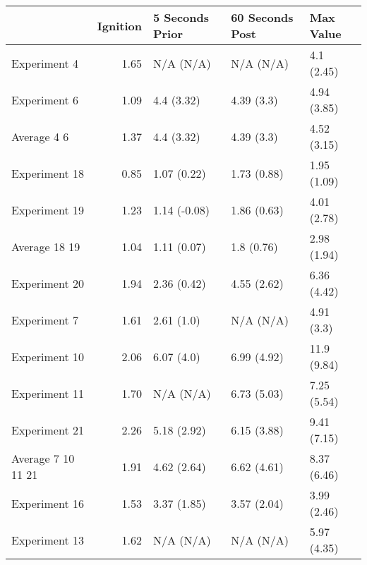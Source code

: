 \begin{tabular}{lrlll}
\toprule
{} &  Ignition & 5 Seconds Prior & 60 Seconds Post &    Max Value \\
\midrule
Experiment 4       &      1.65 &       N/A (N/A) &       N/A (N/A) &   4.1 (2.45) \\
Experiment 6       &      1.09 &      4.4 (3.32) &      4.39 (3.3) &  4.94 (3.85) \\
Average 4 6        &      1.37 &      4.4 (3.32) &      4.39 (3.3) &  4.52 (3.15) \\
Experiment 18      &      0.85 &     1.07 (0.22) &     1.73 (0.88) &  1.95 (1.09) \\
Experiment 19      &      1.23 &    1.14 (-0.08) &     1.86 (0.63) &  4.01 (2.78) \\
Average 18 19      &      1.04 &     1.11 (0.07) &      1.8 (0.76) &  2.98 (1.94) \\
Experiment 20      &      1.94 &     2.36 (0.42) &     4.55 (2.62) &  6.36 (4.42) \\
Experiment 7       &      1.61 &      2.61 (1.0) &       N/A (N/A) &   4.91 (3.3) \\
Experiment 10      &      2.06 &      6.07 (4.0) &     6.99 (4.92) &  11.9 (9.84) \\
Experiment 11      &      1.70 &       N/A (N/A) &     6.73 (5.03) &  7.25 (5.54) \\
Experiment 21      &      2.26 &     5.18 (2.92) &     6.15 (3.88) &  9.41 (7.15) \\
Average 7 10 11 21 &      1.91 &     4.62 (2.64) &     6.62 (4.61) &  8.37 (6.46) \\
Experiment 16      &      1.53 &     3.37 (1.85) &     3.57 (2.04) &  3.99 (2.46) \\
Experiment 13      &      1.62 &       N/A (N/A) &       N/A (N/A) &  5.97 (4.35) \\
\bottomrule
\end{tabular}
